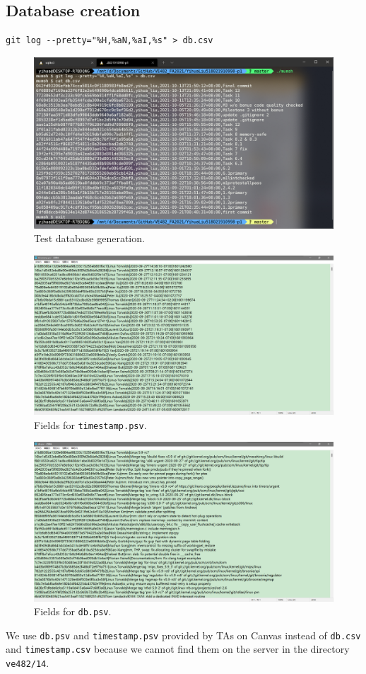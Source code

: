 \documentclass[a4paper]{article}
\begin{document}
\subsection{Database creation}
\begin{verbatim}
git log --pretty="%H,%aN,%aI,%s" > db.csv
\end{verbatim}
\begin{figure}[H]
    \centering
    \includegraphics[width=1\textwidth]{1.png}
    \caption{Test database generation.}
\end{figure}
\begin{figure}[H]
    \centering
    \includegraphics[width=1\textwidth]{2.png}
    \caption{Fields for \texttt{timestamp.psv}.}
\end{figure}
\begin{figure}[H]
    \centering
    \includegraphics[width=1\textwidth]{3.png}
    \caption{Fields for \texttt{db.psv}.}
\end{figure}
We use \texttt{db.psv} and \texttt{timestamp.psv} provided by TAs on Canvas instead of \texttt{db.csv} and \texttt{timestamp.csv} because we cannot find them on the server in the directory \texttt{ve482/14}.
\end{document}
